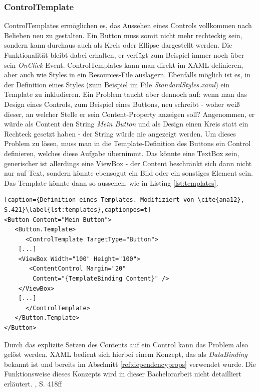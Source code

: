 \documentclass[a4paper,bibtotoc,oneside]{scrbook}
\begin{document}
\subsubsection[ControlTemplate]{ControlTemplate}\label{ref:controltemplate}
ControlTemplates ermöglichen es, das Aussehen eines Controls vollkommen nach Belieben neu zu gestalten. Ein Button muss somit nicht mehr rechteckig sein, sondern kann durchaus auch als Kreis oder Ellipse dargestellt werden. Die Funktionalität bleibt dabei erhalten, er verfügt zum Beispiel immer noch über sein \textit{OnClick}-Event.
\newline
\newline
ControlTemplates kann man direkt im XAML definieren, aber auch wie Styles in ein Resources-File auslagern. Ebenfalls möglich ist es, in der Definition eines Styles (zum Beispiel im File \textit{StandardStyles.xaml})  ein Template zu inkludieren.
\newline
\newline
Ein Problem taucht aber dennoch auf: wenn man das Design eines Controls, zum Beispiel eines Buttons, neu schreibt - woher weiß dieser, an welcher Stelle er sein Content-Property anzeigen soll? Angenommen, er würde als Content den String \textit{Mein Button} und als Design einen Kreis statt ein Rechteck gesetzt haben - der String würde nie angezeigt werden.
\newline
Um dieses Problem zu lösen, muss man in die Template-Definition des Buttons ein Control definieren, welches diese Aufgabe übernimmt. Das könnte eine TextBox sein, generischer ist allerdings eine ViewBox - der Content beschränkt sich dann nicht nur auf Text, sondern könnte ebensogut ein Bild oder ein sonstiges Element sein. Das Template könnte dann so aussehen, wie in Listing \ref{lst:templates}.
\begin{lstlisting}[caption={Definition eines Templates. Modifiziert von \cite{ana12}, S.421}\label{lst:templates},captionpos=t]
<Button Content="Mein Button">
   <Button.Template>
      <ControlTemplate TargetType="Button">
	[...]
	<ViewBox Width="100" Height="100">
	   <ContentControl Margin="20"
		Content="{TemplateBinding Content}" />
	</ViewBox>
	[...]
      </ControlTemplate>
   </Button.Template>
</Button>
\end{lstlisting}
Durch das explizite Setzen des Contents auf ein Control kann das Problem also gelöst werden. XAML bedient sich hierbei einem Konzept, das als \textit{DataBinding} bekannt ist und bereits im Abschnitt \ref{ref:dependencyprops} verwendet wurde. Die Funktionsweise dieses Konzepts wird in dieser Bachelorarbeit nicht detailliert erläutert.
\cite{ana12}, S. 418ff
\end{document}
